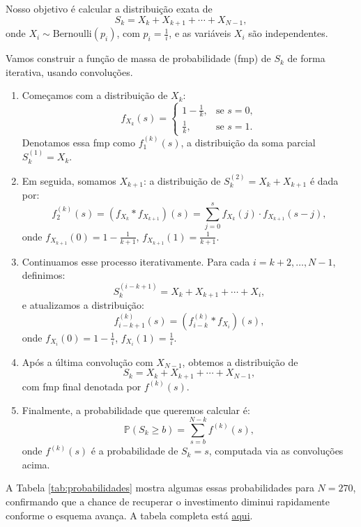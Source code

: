 \documentclass[a4paper,12pt]{article}
\begin{document}
  

Nosso objetivo é calcular a distribuição exata de
\[
S_k = X_k + X_{k+1} + \cdots + X_{N-1},
\]
onde \(X_i \sim \mathrm{Bernoulli}(p_i)\), com \(p_i = \frac{1}{i}\), e as variáveis \(X_i\) são independentes.

Vamos construir a função de massa de probabilidade (fmp) de \(S_k\) de forma iterativa, usando convoluções.

\begin{enumerate}
  \item Começamos com a distribuição de \(X_k\):
  \[
  f_{X_k}(s) =
  \begin{cases}
    1 - \tfrac{1}{k}, & \text{se } s = 0, \\
    \tfrac{1}{k},     & \text{se } s = 1.
  \end{cases}
  \]
  Denotamos essa fmp como \(f^{(k)}_1(s)\), a distribuição da soma parcial \(S_k^{(1)} = X_k\).

  \item Em seguida, somamos \(X_{k+1}\): a distribuição de \(S_k^{(2)} = X_k + X_{k+1}\) é dada por:
  \[
  f^{(k)}_2(s) = (f_{X_k} * f_{X_{k+1}})(s) = \sum_{j=0}^{s} f_{X_k}(j) \cdot f_{X_{k+1}}(s - j),
  \]
  onde \(f_{X_{k+1}}(0) = 1 - \tfrac{1}{k+1}\), \(f_{X_{k+1}}(1) = \tfrac{1}{k+1}\).

  \item Continuamos esse processo iterativamente. Para cada \(i = k+2, \dots, N-1\), definimos:
  \[
  S_k^{(i - k + 1)} = X_k + X_{k+1} + \cdots + X_i,
  \]
  e atualizamos a distribuição:
  \[
  f^{(k)}_{i - k + 1}(s) = (f^{(k)}_{i - k} * f_{X_i})(s),
  \]
  onde \(f_{X_i}(0) = 1 - \tfrac{1}{i}\), \(f_{X_i}(1) = \tfrac{1}{i}\).

  \item Após a última convolução com \(X_{N-1}\), obtemos a distribuição de
  \[
  S_k = X_k + X_{k+1} + \cdots + X_{N-1},
  \]
  com fmp final denotada por \(f^{(k)}(s)\).

  \item Finalmente, a probabilidade que queremos calcular é:
  \[
  \mathbb{P}(S_k \geq b) = \sum_{s =  b }^{N - k} f^{(k)}(s),
  \]
  onde \(f^{(k)}(s)\) é a probabilidade de \(S_k = s\), computada via
  as convoluções acima.
\end{enumerate}



A Tabela \ref{tab:probabilidades} mostra algumas essas probabilidades
para $N=270$, confirmando que a chance de recuperar o investimento
diminui rapidamente conforme o esquema avança. A tabela completa está
\href{https://docs.google.com/spreadsheets/d/1xrFkBaQD_7dD_BXeq6PeXPoeMQ9u4H8-G-ZwPQcySSI/edit?usp=sharing}{aqui}.
\end{document}
